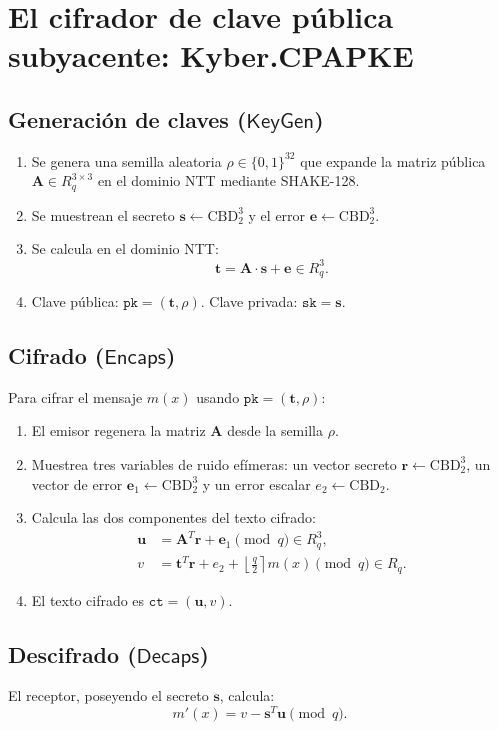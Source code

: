 \documentclass[11pt,a4paper,twoside,openright]{book}
\theoremstyle{plain}
\theoremstyle{definition}
\theoremstyle{remark}
\newcommand{\Rq}{R_q}
\newcommand{\vv}[1]{\mathbf{#1}}
\newcommand{\mm}[1]{\mathbf{#1}}
\newcommand{\KeyGen}{\mathsf{KeyGen}}
\newcommand{\Encaps}{\mathsf{Encaps}}
\newcommand{\Decaps}{\mathsf{Decaps}}
\newcommand{\round}[1]{\left\lfloor #1 \right\rceil}
\newcommand{\CBD}{\mathrm{CBD}}
\begin{document}
\section{El cifrador de clave p\'ublica subyacente: Kyber.CPAPKE}

\subsection{Generaci\'on de claves ($\KeyGen$)}
\begin{enumerate}
  \item Se genera una semilla aleatoria $\rho \in \{0, 1\}^{32}$ que expande la matriz p\'ublica $\mm{A} \in \Rq^{3 \times 3}$ en el dominio NTT mediante SHAKE-128.
  \item Se muestrean el secreto $\vv{s} \leftarrow \CBD_2^3$ y el error $\vv{e} \leftarrow \CBD_2^3$.
  \item Se calcula en el dominio NTT:
  \[
    \vv{t} = \mm{A} \cdot \vv{s} + \vv{e} \in \Rq^3.
  \]
  \item Clave p\'ublica: $\mathtt{pk} = (\vv{t}, \rho)$. Clave privada: $\mathtt{sk} = \vv{s}$.
\end{enumerate}

\subsection{Cifrado ($\Encaps$)}
Para cifrar el mensaje $m(x)$ usando $\mathtt{pk} = (\vv{t}, \rho)$:
\begin{enumerate}
  \item El emisor regenera la matriz $\mm{A}$ desde la semilla $\rho$.
  \item Muestrea tres variables de ruido ef\'imeras: un vector secreto $\vv{r} \leftarrow \CBD_2^3$, un vector de error $\vv{e}_1 \leftarrow \CBD_2^3$ y un error escalar $e_2 \leftarrow \CBD_2$.
  \item Calcula las dos componentes del texto cifrado:
  \begin{align}
    \vv{u} &= \mm{A}^T \vv{r} + \vv{e}_1 \pmod q \in \Rq^3, \\
    v &= \vv{t}^T \vv{r} + e_2 + \round{\frac{q}{2}} m(x) \pmod q \in \Rq.
  \end{align}
  \item El texto cifrado es $\mathtt{ct} = (\vv{u}, v)$.
\end{enumerate}

\subsection{Descifrado ($\Decaps$)}
El receptor, poseyendo el secreto $\vv{s}$, calcula:
\[
  m'(x) = v - \vv{s}^T \vv{u} \pmod q.
\]
\end{document}

